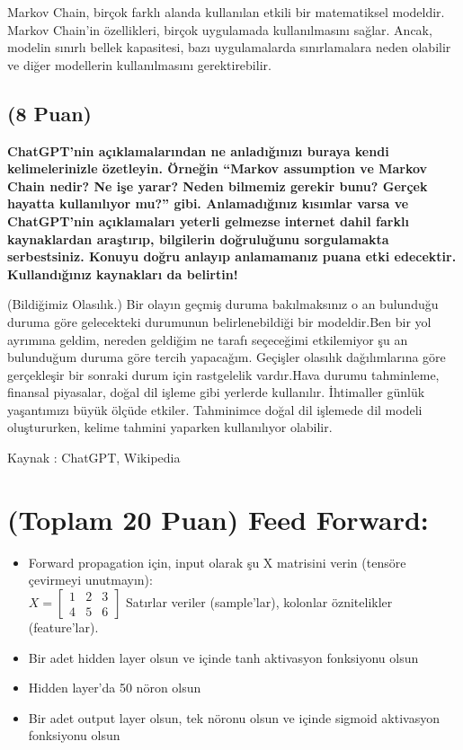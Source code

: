 \documentclass[11pt]{article}
\begin{document}
Markov Chain, birçok farklı alanda kullanılan etkili bir matematiksel modeldir. Markov Chain'in özellikleri, birçok uygulamada kullanılmasını sağlar. Ancak, modelin sınırlı bellek kapasitesi, bazı uygulamalarda sınırlamalara neden olabilir ve diğer modellerin kullanılmasını gerektirebilir.

\subsection{(8 Puan)} \textbf{ChatGPT’nin açıklamalarından ne anladığınızı buraya kendi kelimelerinizle özetleyin. Örneğin ``Markov assumption ve Markov Chain nedir? Ne işe yarar? Neden bilmemiz gerekir bunu? Gerçek hayatta kullanılıyor mu?'' gibi. Anlamadığınız kısımlar varsa ve ChatGPT’nin açıklamaları yeterli gelmezse internet dahil farklı kaynaklardan araştırıp, bilgilerin doğruluğunu sorgulamakta serbestsiniz. Konuyu doğru anlayıp anlamamanız puana etki edecektir. Kullandığınız kaynakları da belirtin!}

(Bildiğimiz Olasılık.) Bir olayın geçmiş duruma bakılmaksınız o an bulunduğu duruma göre gelecekteki durumunun belirlenebildiği bir modeldir.Ben bir yol ayrımına geldim, nereden geldiğim ne tarafı seçeceğimi etkilemiyor şu an bulunduğum duruma göre tercih yapacağım. Geçişler olasılık dağılımlarına göre gerçekleşir bir sonraki durum için rastgelelik vardır.Hava durumu tahminleme, finansal piyasalar, doğal dil işleme gibi yerlerde kullanılır. İhtimaller günlük yaşantımızı büyük ölçüde etkiler. Tahminimce doğal dil işlemede dil modeli oluştururken, kelime tahmini yaparken kullanılıyor olabilir.

Kaynak : ChatGPT, Wikipedia

\section{(Toplam 20 Puan) Feed Forward:}
 
\begin{itemize}
    \item Forward propagation için, input olarak şu X matrisini verin (tensöre çevirmeyi unutmayın):\\
    $X = \begin{bmatrix}
        1 & 2 & 3\\
        4 & 5 & 6
        \end{bmatrix}$
    Satırlar veriler (sample'lar), kolonlar öznitelikler (feature'lar).
    \item Bir adet hidden layer olsun ve içinde tanh aktivasyon fonksiyonu olsun
    \item Hidden layer'da 50 nöron olsun
    \item Bir adet output layer olsun, tek nöronu olsun ve içinde sigmoid aktivasyon fonksiyonu olsun
\end{itemize}
\end{document}
